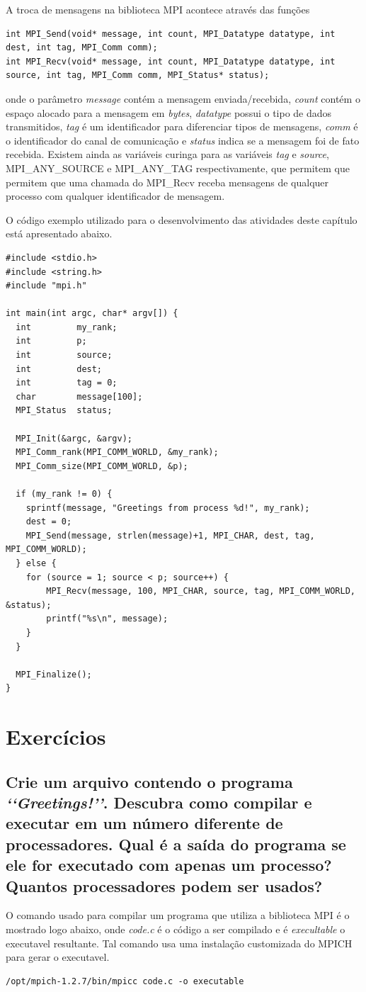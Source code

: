 \documentclass[11pt,a4paper,onecolumn]{article}
\begin{document}
A troca de mensagens na biblioteca MPI acontece através das funções
\begin{lstlisting}[style=cc,numbers=none]
int MPI_Send(void* message, int count, MPI_Datatype datatype, int dest, int tag, MPI_Comm comm);
int MPI_Recv(void* message, int count, MPI_Datatype datatype, int source, int tag, MPI_Comm comm, MPI_Status* status);
\end{lstlisting}
onde o parâmetro \textit{message} contém a mensagem enviada/recebida, \textit{count} contém o espaço alocado para a mensagem em \textit{bytes}, \textit{datatype} possui o tipo de dados transmitidos, \textit{tag} é um identificador para diferenciar tipos de mensagens, \textit{comm} é o identificador do canal de comunicação e \textit{status} indica se a mensagem foi de fato recebida.
Existem ainda as variáveis curinga para as variáveis \textit{tag} e \textit{source}, MPI\_ANY\_SOURCE e MPI\_ANY\_TAG respectivamente, que permitem que permitem que uma chamada do MPI\_Recv receba mensagens de qualquer processo com qualquer identificador de mensagem.

O código exemplo utilizado para o desenvolvimento das atividades deste capítulo está apresentado abaixo.
\begin{lstlisting}[style=cc]
#include <stdio.h>
#include <string.h>
#include "mpi.h"

int main(int argc, char* argv[]) {
  int         my_rank;
  int         p;
  int         source;
  int         dest;
  int         tag = 0;
  char        message[100];
  MPI_Status  status;

  MPI_Init(&argc, &argv);
  MPI_Comm_rank(MPI_COMM_WORLD, &my_rank);
  MPI_Comm_size(MPI_COMM_WORLD, &p);

  if (my_rank != 0) {
    sprintf(message, "Greetings from process %d!", my_rank);
    dest = 0;
    MPI_Send(message, strlen(message)+1, MPI_CHAR, dest, tag, MPI_COMM_WORLD);
  } else {
    for (source = 1; source < p; source++) {
        MPI_Recv(message, 100, MPI_CHAR, source, tag, MPI_COMM_WORLD, &status);
        printf("%s\n", message);
    }
  }

  MPI_Finalize();
}
\end{lstlisting}

\section{Exercícios}
\subsection{Crie um arquivo contendo o programa \textit{\lq\lq{}Greetings!\rq\rq{}}. Descubra como compilar e executar em um número diferente de processadores. Qual é a saída do programa se ele for executado com apenas um processo? Quantos processadores podem ser usados?}
O comando usado para compilar um programa que utiliza a biblioteca MPI é o mostrado logo abaixo, onde \textit{code.c} é o código a ser compilado e é \textit{execultable} o executavel resultante. Tal comando usa uma instalação customizada do MPICH para gerar o executavel.
\begin{lstlisting}[style=cbash]
/opt/mpich-1.2.7/bin/mpicc code.c -o executable
\end{lstlisting}
\end{document}
